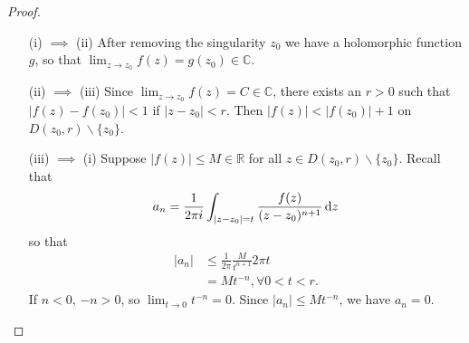 \begin{proof}
  \begin{itemize}
    \item[(i) $\implies$ (ii)]
      {
        After removing the singularity $z_0$ we have a holomorphic
        function $g$, so that $\lim_{z \to z_0} f(z) = g(z_0) \in \mathbb{C}$.
      }
    \item[(ii) $\implies$ (iii)]
      {
        Since $\lim_{z \to z_0} f(z) = C \in \mathbb{C}$, there exists
        an $r > 0$ such that $|f(z) - f(z_0)| < 1$ if $|z - z_0| < r$.
        Then $|f(z)| < |f(z_0)| + 1$ on $D(z_0, r) \backslash \{ z_0 \}$.
      }
    \item[(iii) $\implies$ (i)]
      {
        Suppose $|f(z)| \leq M \in \mathbb{R}$ for all
        $z \in D(z_0, r) \backslash \{ z_0 \}$.
        Recall that
        $$
          a_n
        = \frac{1}{2 \pi i}
          \int_{|z - z_0| = t}
            \frac{f(z)}{(z - z_0)^{n+1}}
            \mathop{}\!\mathrm{d} z
        $$
        so that
        \begin{align*}
              |a_n|
        &\leq \frac{1}{2 \pi} \frac{M}{t^{n+1}} 2 \pi t \\
        &=    M t^{-n}, \forall 0 < t < r.
        \end{align*}
        If $n < 0$, $-n > 0$, so
        $\lim_{t \to 0} t^{-n} = 0$. Since
        $|a_n| \leq M t^{-n}$, we have $a_n = 0$.
      }
  \end{itemize}
\end{proof}
